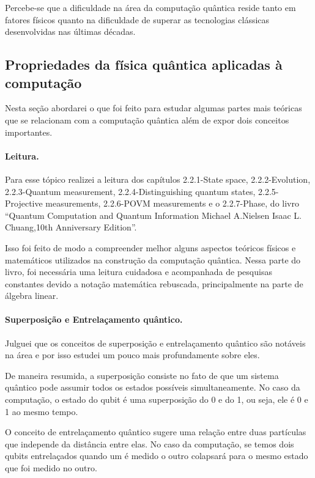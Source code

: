 \documentclass{article}
\begin{document}
        Percebe-se que a dificuldade na área da computação quântica reside tanto em fatores físicos quanto na dificuldade de superar as tecnologias clássicas desenvolvidas nas últimas décadas.  

    \subsection{Propriedades da física quântica aplicadas à computação}
        Nesta seção abordarei o que foi feito para estudar algumas partes mais teóricas que se relacionam com a computação quântica além de expor dois conceitos importantes.
        
        \paragraph{Leitura.}
        Para esse tópico realizei a leitura dos capítulos 2.2.1-State space, 2.2.2-Evolution, 2.2.3-Quantum measurement, 2.2.4-Distinguishing quantum states, 2.2.5-Projective measurements, 2.2.6-POVM measurements e o 2.2.7-Phase, do livro ``Quantum Computation and Quantum Information Michael A.Nielsen Isaac L. Chuang,10th Anniversary Edition''. 
        
        Isso foi feito de modo a compreender melhor alguns aspectos teóricos físicos e matemáticos utilizados na construção da computação quântica. Nessa parte do livro, foi necessária uma leitura cuidadosa e acompanhada de pesquisas constantes devido a notação matemática rebuscada, principalmente na parte de álgebra linear.
        
        \paragraph{Superposição e Entrelaçamento quântico.}
        Julguei que os conceitos de superposição e entrelaçamento quântico são notáveis na área e por isso estudei um pouco mais profundamente sobre eles.
    
        De maneira resumida, a superposição consiste no fato de que um sistema quântico pode assumir todos os estados possíveis simultaneamente. No caso da computação, o estado do qubit é uma superposição do 0 e do 1, ou seja, ele é 0 e 1 ao mesmo tempo. 
    
        O conceito de entrelaçamento quântico sugere uma relação entre duas partículas que independe da distância entre elas. No caso da computação, se temos dois qubits entrelaçados quando um é medido o outro colapsará para o mesmo estado que foi medido no outro.
\end{document}
